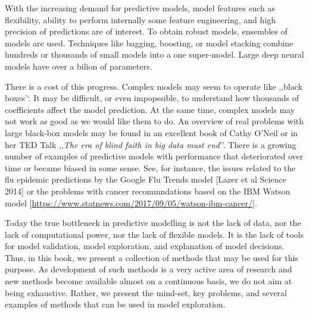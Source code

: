 \documentclass[]{krantz}
\theoremstyle{definition}
\theoremstyle{definition}
\theoremstyle{definition}
\theoremstyle{remark}
\begin{document}
With the increasing demand for predictive models, model features such as
flexibility, ability to perform internally some feature engineering, and
high precision of predictions are of interest. To obtain robust models,
ensembles of models are used. Techniques like bagging, boosting, or
model stacking combine hundreds or thousands of small models into a one
super-model. Large deep neural models have over a bilion of parameters.

There is a cost of this progress. Complex models may seem to operate
like ,,black boxes'`. It may be difficult, or even impopssible, to
understand how thousands of coefficients affect the model prediction. At
the same time, complex models may not work as good as we would like them
to do. An overview of real problems with large black-box models may be
found in an excellent book of Cathy O'Neil \citep{ONeil} or in her TED
Talk ,,\emph{The era of blind faith in big data must end}''. There is a
growing number of examples of predictive models with performance that
deteriorated over time or became biased in some sense. See, for
instance, the issues related to the flu epidemic predictions by the
Google Flu Trends model {[}Lazer et al Science 2014{]} or the problems
with cancer recommndations based on the IBM Watson model
{[}\url{https://www.statnews.com/2017/09/05/watson-ibm-cancer/}{]}.

Today the true bottleneck in predictive modelling is not the lack of
data, nor the lack of computational power, nor the lack of flexible
models. It is the lack of tools for model validation, model exploration,
and explanation of model decisions. Thus, in this book, we present a
collection of methods that may be used for this purpose. As development
of such methods is a very active area of research and new methods become
available almost on a continuous basis, we do not aim at being
exhaustive. Rather, we present the mind-set, key problems, and several
examples of methods that can be used in model exploration.
\end{document}
